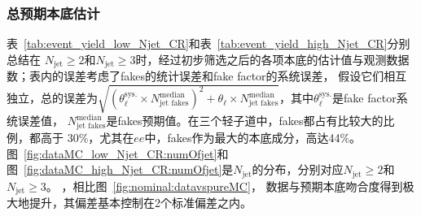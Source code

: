 \subsubsection{总预期本底估计}
表~\ref{tab:event_yield_low_Njet_CR}和表~\ref{tab:event_yield_high_Njet_CR}分别总结在
$N_{\text{jet}}\geq2$和$N_{\text{jet}}\geq3$时，经过初步筛选之后的各项本底的估计值与观测数据数；表内的误差考虑了fakes的统计误差和fake factor的系统误差，
假设它们相互独立，总的误差为$\sqrt{({\theta_{\ell}^{\text{sys.}}\times N^{\text{median}}_{\text{jet fakes}}})^2+\theta_{\ell}\times N^{\text{median}}_{\text{jet fakes}}}$，其中$\theta_{\ell}^{\text{sys.}}$是fake factor系统误差值，
$N^{\text{median}}_{\text{jet fakes}}$是fakes预期值。在三个轻子道中，fakes都占有比较大的比例，都高于
30\%，尤其在$ee$中，fakes作为最大的本底成分，高达44\%。
图~\ref{fig:dataMC_low_Njet_CR:numOfjet}和图~\ref{fig:dataMC_high_Njet_CR:numOfjet}是$N_{\text{jet}}$的分布，分别对应$N_{\text{jet}}\geq2$和$N_{\text{jet}}\geq3$。
，相比图~\ref{fig:nominal:datavspureMC}，
数据与预期本底吻合度得到极大地提升，其偏差基本控制在2个标准偏差之内。

